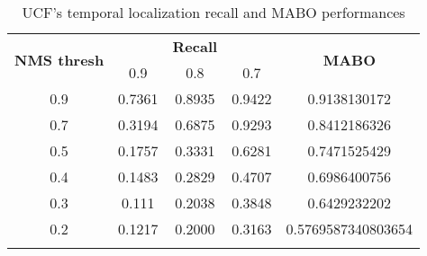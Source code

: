 \begin{center}
  \begin{longtable}{|| c || c c c | c |}
    \hline
    \multirow{2}{*}{\textbf{NMS thresh}} & {} & {\textbf{Recall}} & {} & \multirow{2}{*}{\textbf{MABO}} \\
      {} & 0.9 & 0.8 & 0.7 & {} \\
      \hline
      0.9 & 0.7361 & 0.8935 & 0.9422 & 0.9138130172 \\
      \hline
      0.7 & 0.3194 & 0.6875 & 0.9293 & 0.8412186326 \\
      \hline
      0.5 & 0.1757 & 0.3331 & 0.6281 & 0.7471525429 \\
      \hline
      0.4 &0.1483 & 0.2829 & 0.4707 & 0.6986400756 \\
      \hline
      0.3 & 0.111 & 0.2038 & 0.3848 & 0.6429232202 \\
      \hline
      0.2 & 0.1217  & 0.2000 & 0.3163 & 0.5769587340803654 \\
      \hline
    \caption{UCF's temporal localization recall and MABO performances}
    \label{table:temp_cls_recall_1}
  \end{longtable}
\end{center}

